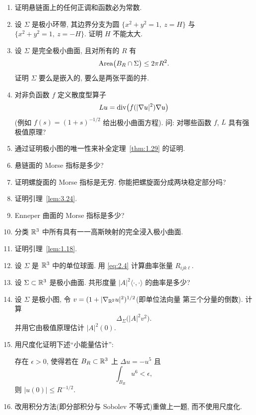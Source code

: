 \begin{enumerate}[label=\textbf{Ex \arabic*.},leftmargin=3.7em,
  labelsep=0.5em,itemsep=0.85em,topsep=0.5em,parsep=0.35em]
\item 证明悬链面上的任何正调和函数必为常数.

\item 设 $\Sigma$ 是极小环带, 其边界分支为圆
$\{x^2+y^2=1,\ z=H\}$ 与 $\{x^2+y^2=1,\ z=-H\}$. 证明 $H$ 不能太大.

\item 设 $\Sigma$ 是完全极小曲面, 且对所有的 $R$ 有
\[
\operatorname{Area}\bigl(B_R\cap\Sigma\bigr)\leq2\pi R^2 .
\]
证明 $\Sigma$ 要么是嵌入的, 要么是两张平面的并.

\item 对非负函数 $f$ 定义散度型算子
\[
Lu=\operatorname{div}\bigl(f(|\nabla u|^2)\nabla u\bigr)
\]
(例如 $f(s)=(1+s)^{-1/2}$ 给出极小曲面方程). 问: 对哪些函数 $f$, $L$
具有强极值原理?

\item 通过证明极小图的唯一性来补全定理~\ref{thm:1.29} 的证明.

\item 悬链面的 Morse 指标是多少?

\item 证明螺旋面的 Morse 指标是无穷. 你能把螺旋面分成两块稳定部分吗?

\item 证明引理~\ref{lem:3.24}.

\item Enneper 曲面的 Morse 指标是多少?

\item 分类 $\mathbb{R}^3$ 中所有具有一一高斯映射的完全浸入极小曲面.

\item 证明引理~\ref{lem:1.18}.

\item 设 $\Sigma$ 是 $\mathbb{R}^3$ 中的单位球面. 用 \eqref{eq:2.4} 计算曲率张量
$R_{ijk\ell}$.

\item 设 $\Sigma\subset\mathbb{R}^3$ 是极小曲面. 共形度量 $|A|^2\langle\cdot,\cdot\rangle$
的曲率是多少?

\item 设 $\Sigma$ 是极小图, 令 $v=(1+|\nabla_{\mathbb{R}^2}u|^2)^{1/2}$(即单位法向量
第三个分量的倒数). 计算
\[
\Delta_\Sigma\bigl(|A|^2v^2\bigr).
\]
并用它由极值原理估计 $|A|^2(0)$.

\item 用尺度化证明下述``小能量估计'':

存在 $\epsilon>0$, 使得若在 $B_R\subset\mathbb{R}^3$ 上 $\Delta u=-u^5$ 且
\[
\int_{B_R}u^6<\epsilon,
\]
则 $|u(0)|\leq R^{-1/2}$.

\item 改用积分方法(即分部积分与 Sobolev 不等式)重做上一题, 而不使用尺度化.


\end{enumerate}
